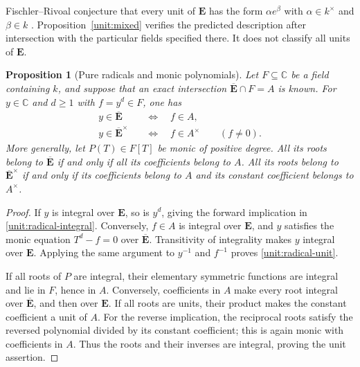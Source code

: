 \documentclass[11pt]{article}
\newtheorem{proposition}[theorem]{Proposition}
\theoremstyle{definition}
\theoremstyle{remark}
\newcommand{\E}{\mathbf E}
\newcommand{\Ebar}{\overline{\mathbf E}}
\begin{document}
Fischler--Rivoal conjecture that every unit of $\E$ has the form
$\alpha e^\beta$ with $\alpha\in k^\times$ and $\beta\in k$
\cite[Conjecture~1.2]{FR26}. Proposition~\ref{unit:mixed} verifies
the predicted description after intersection with the particular fields
specified there. It does not classify all units of $\E$.

\begin{proposition}[Pure radicals and monic polynomials]
\label{unit:radicals}
Let $F\subseteq\mathbb C$ be a field containing $k$, and suppose
that an exact intersection $\Ebar\cap F=A$ is known. For $y\in\mathbb C$
and $d\ge1$ with $f=y^d\in F$, one has
\begin{align}
 y\in\Ebar&\quad\Longleftrightarrow\quad f\in A,
                                      \label{unit:radical-integral}\\
 y\in\Ebar^\times&\quad\Longleftrightarrow\quad f\in A^\times
                    \qquad(f\ne0).\label{unit:radical-unit}
\end{align}
More generally, let $P(T)\in F[T]$ be monic of positive degree.
All its roots belong to $\Ebar$ if and only if all its coefficients
belong to $A$. All its roots belong to $\Ebar^\times$ if and only
if its coefficients belong to $A$ and its constant coefficient belongs
to $A^\times$.
\end{proposition}
\begin{proof}
If $y$ is integral over $\E$, so is $y^d$, giving the forward
implication in \eqref{unit:radical-integral}. Conversely, $f\in A$
is integral over $\E$, and $y$ satisfies the monic equation
$T^d-f=0$ over $\Ebar$. Transitivity of integrality makes $y$
integral over $\E$. Applying the same argument to $y^{-1}$ and
$f^{-1}$ proves \eqref{unit:radical-unit}.

If all roots of $P$ are integral, their elementary symmetric functions
are integral and lie in $F$, hence in $A$. Conversely, coefficients
in $A$ make every root integral over $\Ebar$, and then over $\E$.
If all roots are units, their product makes the constant coefficient a
unit of $A$. For the reverse implication, the reciprocal roots satisfy
the reversed polynomial divided by its constant coefficient; this is
again monic with coefficients in $A$. Thus the roots and their inverses
are integral, proving the unit assertion.
\end{proof}
\end{document}
